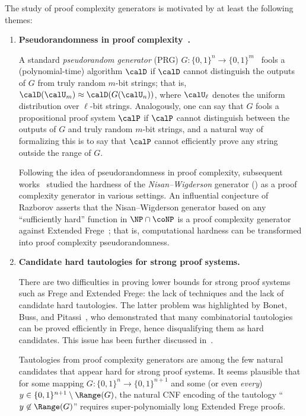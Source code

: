 The study of proof complexity generators is motivated by at least the following themes:
\begin{enumerate}
    \item {\bf Pseudorandomness in proof complexity~\cite{ABRW04}.}
    
    A standard \emph{pseudorandom generator} (PRG) $G: \{0, 1\}^n \to \{0, 1\}^m$~\cite{Yao82a} fools a (polynomial-time) algorithm $\calD$ if $\calD$ cannot distinguish the outputs of $G$ from truly random $m$-bit strings; that is, $\calD(\calU_m) \approx \calD(G(\calU_n))$, where $\calU_\ell$ denotes the uniform distribution over $\ell$-bit strings. Analogously, one can say that $G$ fools a propositional proof system $\calP$ if $\calP$ cannot distinguish between the outputs of $G$ and truly random $m$-bit strings, and a natural way of formalizing this is to say that $\calP$ cannot efficiently prove any string outside the range of $G$.

    Following the idea of pseudorandomness in proof complexity, subsequent works~\cite{Krajicek04, Pich11, Krajicek11, razborov2015pseudorandom, Khaniki22} studied the hardness of the \emph{Nisan--Wigderson} generator (\cite{NisanW94}) as a proof complexity generator in various settings. An influential conjecture of Razborov asserts that the Nisan--Wigderson generator based on any ``sufficiently hard'' function in $\NP\cap\coNP$ is a proof complexity generator against Extended Frege~\cite[Conjecture 2]{razborov2015pseudorandom}; that is, computational hardness can be transformed into proof complexity pseudorandomness.

    \item {\bf Candidate hard tautologies for strong proof systems.}
    
    There are two difficulties in proving lower bounds for strong proof systems such as Frege and Extended Frege: the lack of techniques and the lack of candidate hard tautologies. The latter problem was highlighted by Bonet, Buss, and Pitassi~\cite{BBP95}, who demonstrated that many combinatorial tautologies can be proved efficiently in Frege, hence disqualifying them as hard candidates. This issue has been further discussed in~\cite{krajivcek2001tautologies, Krajicek04, SanthanamT21, Khaniki22}.
    
    Tautologies from proof complexity generators are among the few natural candidates that appear hard for strong proof systems. It seems plausible that for some mapping $G: \{0, 1\}^n \to \{0, 1\}^{n+1}$ and some (or even \emph{every}) $y\in\{0, 1\}^{n+1}\setminus \Range(G)$, the natural CNF encoding of the tautology ``$y\not\in\Range(G)$'' requires super-polynomially long Extended Frege proofs.


\end{enumerate}
